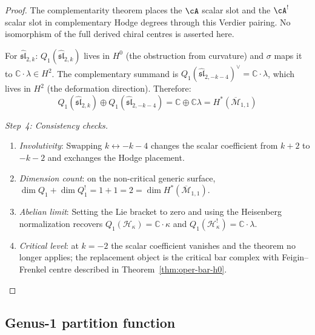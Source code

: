\begin{proof}
The complementarity theorem places the $\cA$ scalar slot and the
$\cA^!$ scalar slot in complementary Hodge degrees through this Verdier
pairing.  No isomorphism of the full derived chiral centres is asserted
here.

For $\widehat{\mathfrak{sl}}_{2,k}$: $Q_1(\widehat{\mathfrak{sl}}_{2,k})$ lives in $H^0$ (the obstruction from curvature) and $\sigma$ maps it to $\mathbb{C} \cdot \lambda \in H^2$. The complementary summand is $Q_1(\widehat{\mathfrak{sl}}_{2,-k-4})^\vee = \mathbb{C} \cdot \lambda$, which lives in $H^2$ (the deformation direction). Therefore:
\begin{equation}
Q_1(\widehat{\mathfrak{sl}}_{2,k}) \oplus Q_1(\widehat{\mathfrak{sl}}_{2,-k-4}) = \mathbb{C} \oplus \mathbb{C}\lambda = H^*(\overline{\mathcal{M}}_{1,1})
\end{equation}

\emph{Step~4: Consistency checks.}
\begin{enumerate}
\item \emph{Involutivity}: Swapping $k \leftrightarrow -k-4$ changes the
 scalar coefficient from $k+2$ to $-k-2$ and exchanges the Hodge
 placement.
\item \emph{Dimension count}: on the non-critical generic surface,
 $\dim Q_1 + \dim Q_1^! = 1 + 1 = 2 =
 \dim H^*(\overline{\mathcal{M}}_{1,1})$.
\item \emph{Abelian limit}: Setting the Lie bracket to zero and using
 the Heisenberg normalization recovers
 $Q_1(\mathcal{H}_\kappa) = \mathbb{C} \cdot \kappa$ and
 $Q_1(\mathcal{H}_\kappa^!) = \mathbb{C} \cdot \lambda$.
\item \emph{Critical level}: at $k=-2$ the scalar coefficient vanishes
 and the theorem no longer applies; the replacement object is the
 critical bar complex with Feigin--Frenkel centre described in
 Theorem~\ref{thm:oper-bar-h0}.
\end{enumerate}
\end{proof}

\subsection{Genus-1 partition function}

